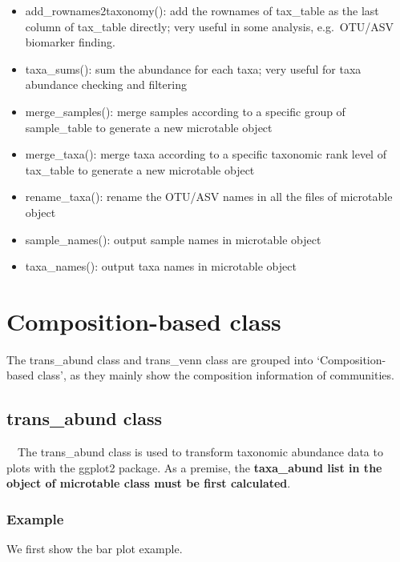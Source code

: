 \documentclass[
]{book}
\newenvironment{Shaded}{\begin{snugshade}}{\end{snugshade}}
\newcommand{\AttributeTok}[1]{\textcolor[rgb]{0.77,0.63,0.00}{#1}}
\newcommand{\CommentTok}[1]{\textcolor[rgb]{0.56,0.35,0.01}{\textit{#1}}}
\newcommand{\DecValTok}[1]{\textcolor[rgb]{0.00,0.00,0.81}{#1}}
\newcommand{\FunctionTok}[1]{\textcolor[rgb]{0.00,0.00,0.00}{#1}}
\newcommand{\NormalTok}[1]{#1}
\newcommand{\OtherTok}[1]{\textcolor[rgb]{0.56,0.35,0.01}{#1}}
\newcommand{\SpecialCharTok}[1]{\textcolor[rgb]{0.00,0.00,0.00}{#1}}
\newcommand{\StringTok}[1]{\textcolor[rgb]{0.31,0.60,0.02}{#1}}
\providecommand{\tightlist}{%
  \setlength{\itemsep}{0pt}\setlength{\parskip}{0pt}}
\begin{document}
\begin{itemize}
\tightlist
\item
  add\_rownames2taxonomy(): add the rownames of tax\_table as the last column of tax\_table directly; very useful in some analysis, e.g.~OTU/ASV biomarker finding.
\item
  taxa\_sums(): sum the abundance for each taxa; very useful for taxa abundance checking and filtering
\item
  merge\_samples(): merge samples according to a specific group of sample\_table to generate a new microtable object
\item
  merge\_taxa(): merge taxa according to a specific taxonomic rank level of tax\_table to generate a new microtable object
\item
  rename\_taxa(): rename the OTU/ASV names in all the files of microtable object
\item
  sample\_names(): output sample names in microtable object
\item
  taxa\_names(): output taxa names in microtable object
\end{itemize}

\hypertarget{composition-based-class}{%
\chapter{Composition-based class}\label{composition-based-class}}

The trans\_abund class and trans\_venn class are grouped into `Composition-based class',
as they mainly show the composition information of communities.

\hypertarget{trans_abund-class}{%
\section{trans\_abund class}\label{trans_abund-class}}

　The trans\_abund class is used to transform taxonomic abundance data to plots with the ggplot2 package.
As a premise, the \textbf{taxa\_abund list in the object of microtable class must be first calculated}.

\hypertarget{example-1}{%
\subsection{Example}\label{example-1}}

We first show the bar plot example.

\begin{Shaded}
\end{Shaded}
\end{document}
